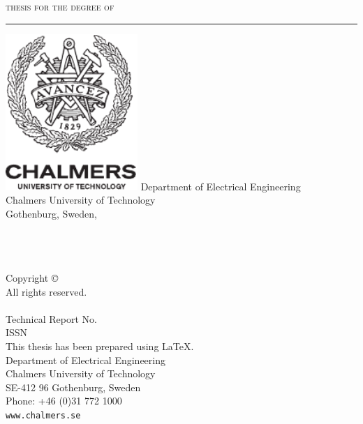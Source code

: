 \documentclass[
	paper=16.9cm:23.9cm,
	pagesize,
	twoside,
	10pt,
	chapterprefix,
	headsepline=on,
	footinclude=off,
	DIV=18,
	BCOR=7mm,
	bibliography=totoc,
	numbers=noenddot,
	open=right,
]{scrreprt}
\begin{document}
\EmptyPage %

\thispagestyle{empty}

\begin{center}
\textsc{thesis for the degree of \TheThesisType}
\vspace{0.5cm}
\hrule
\vspace{3 cm}
{\Large {\TitlePageTitle}\par}
\vspace{1 cm}
{\large\textsc{\TitlePageName}\par} 
\vspace{2 cm}
\includegraphics[width=5cm]{TemplateFiles/logos/chalmers_logo_black}
\vfill
\vspace{0.5 cm}
Department of Electrical Engineering \\
Chalmers University of Technology \\
Gothenburg, Sweden, \TheYear
\end{center}

\newpage

\thispagestyle{empty}

\textbf{\ISSNPageTitle}\\\\
{\textsc{\ISSNPageName}}
\vspace{4.0 cm}\\
Copyright \copyright~\TheYear~\textsc{\ISSNPageName}\\ All rights reserved.\\
\vspace{1.5 cm}\\
Technical Report No.~\TheReportNo \\ 
ISSN \TheISSN\\
\vspace{1 cm}%
This thesis has been prepared using \LaTeX.\\
Department of Electrical Engineering \\
Chalmers University of Technology \\
SE-412 96 Gothenburg, Sweden \\
Phone: +46 (0)31 772 1000 \\
\texttt{www.chalmers.se} \\
\vfill
{}
\end{document}
